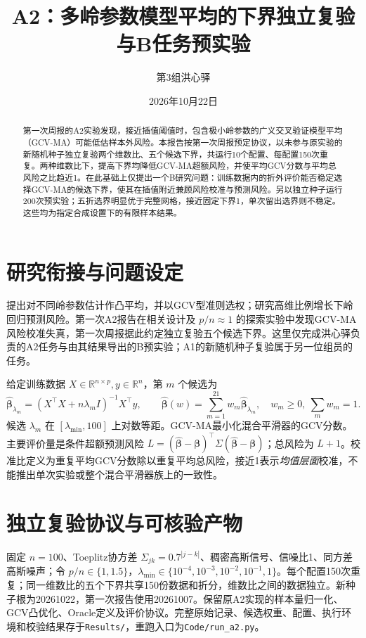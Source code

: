 \documentclass[UTF8,fontset=fandol,11pt,a4paper]{ctexart}
\title{A2：多岭参数模型平均的下界独立复验与B任务预实验}
\author{第3组\quad 洪心驿}
\date{2026年10月22日}
\begin{document}
\maketitle
\begin{abstract}
第一次周报的A2实验发现，接近插值阈值时，包含极小岭参数的广义交叉验证模型平均（GCV-MA）可能低估样本外风险。本报告按第一次周报预定协议，以未参与原实验的新随机种子独立复验两个维数比、五个候选下界，共运行10个配置、每配置150次重复。两种维数比下，提高下界均降低GCV-MA超额风险，并使平均GCV分数与平均总风险之比趋近1。在此基础上仅提出一个B研究问题：训练数据内的折外评价能否稳定选择GCV-MA的候选下界，使其在插值附近兼顾风险校准与预测风险。另以独立种子运行200次预实验；五折选界明显优于完整网格，接近固定下界1，单次留出选界则不稳定。这些均为指定合成设置下的有限样本结果。
\end{abstract}

\section{研究衔接与问题设定}
\citet{yu}提出对不同岭参数估计作凸平均，并以GCV型准则选权；\citet{dw}研究高维比例增长下岭回归预测风险。第一次A2报告在相关设计及 $p/n\approx1$ 的探索实验中发现GCV-MA风险校准失真，第一次周报据此约定独立复验五个候选下界。这里仅完成洪心驿负责的A2任务与由其结果导出的B预实验；A1的新随机种子复验属于另一位组员的任务。

给定训练数据 $X\in\mathbb R^{n\times p},y\in\mathbb R^n$，第 $m$ 个候选为
\begin{equation}
 \widehat{\bm\beta}_{\lambda_m}=(X^\top X+n\lambda_m I)^{-1}X^\top y,
 \qquad \widehat{\bm\beta}(w)=\sum_{m=1}^{21}w_m\widehat{\bm\beta}_{\lambda_m},
 \quad w_m\ge0,\ \sum_mw_m=1.
\end{equation}
候选 $\lambda_m$ 在 $[\lambda_{\min},100]$ 上对数等距。GCV-MA最小化混合平滑器的GCV分数。主要评价量是条件超额预测风险
$L=(\widehat{\bm\beta}-\bm\beta)^\top\Sigma(\widehat{\bm\beta}-\bm\beta)$；总风险为 $L+1$。校准比定义为重复平均GCV分数除以重复平均总风险，接近1表示\emph{均值层面}校准，不能推出单次实验或整个混合平滑器族上的一致性。

\section{独立复验协议与可核验产物}
固定 $n=100$、Toeplitz协方差 $\Sigma_{jk}=0.7^{|j-k|}$、稠密高斯信号、信噪比1、同方差高斯噪声；令 $p/n\in\{1,1.5\}$，$\lambda_{\min}\in\{10^{-4},10^{-3},10^{-2},10^{-1},1\}$。每个配置150次重复；同一维数比的五个下界共享150份数据和折分，维数比之间的数据独立。新种子根为20261022，第一次报告使用20261007。保留原A2实现的样本量归一化、GCV凸优化、Oracle定义及评价协议。完整原始记录、候选权重、配置、执行环境和校验结果存于\texttt{Results/}，重跑入口为\texttt{Code/run\_a2.py}。
\end{document}
